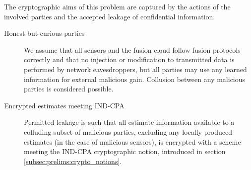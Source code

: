 The cryptographic aims of this problem are captured by the actions of the involved parties and the accepted leakage of confidential information. 
\begin{description}
    \item[Honest-but-curious parties] We assume that all sensors and the fusion cloud follow fusion protocols correctly and that no injection or modification to transmitted data is performed by network eavesdroppers, but all parties may use any learned information for external malicious gain. Collusion between any malicious parties is considered possible.
    \item[Encrypted estimates meeting IND-CPA] Permitted leakage is such that all estimate information available to a colluding subset of malicious parties, excluding any locally produced estimates (in the case of malicious sensors), is encrypted with a scheme meeting the IND-CPA cryptographic notion, introduced in section \ref{subsec:prelims:crypto_notions}.
\end{description}

